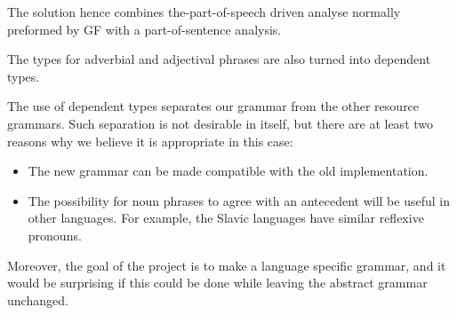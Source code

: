 \documentclass{report}
\begin{document}
The solution hence combines the-part-of-speech driven analyse normally preformed by
GF with a part-of-sentence analysis.

The types for adverbial and adjectival phrases are also turned into dependent
types.

The use of dependent types separates our grammar from the other resource grammars. Such separation
is not desirable in itself, but there are at least two reasons why we
believe it is appropriate in this case:
\begin{itemize}
\item The new grammar can be made compatible with the old implementation.
\item The possibility for noun phrases to agree with an antecedent 
      will be useful in other languages. For example, the Slavic languages
      have similar reflexive pronouns.
\end{itemize}
Moreover, the goal of the project is to make a language specific grammar, and it
would be surprising if this could be done while leaving the abstract grammar unchanged.
\end{document}
